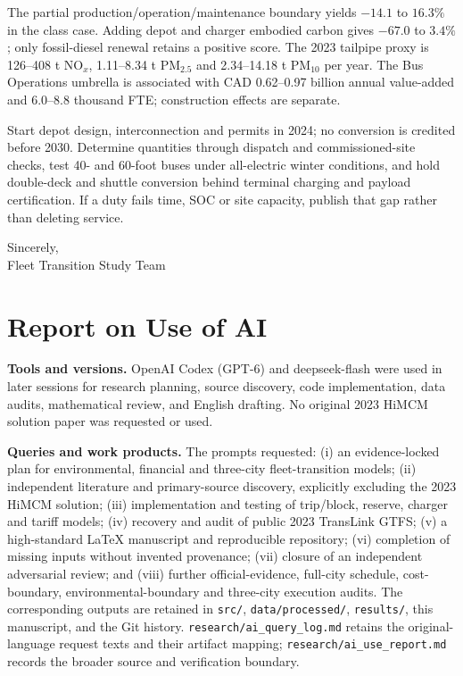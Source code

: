 \documentclass[12pt,letterpaper]{article}
\begin{document}
The partial production/operation/maintenance boundary yields $-14.1$ to $16.3\%$ in the class case. Adding depot and charger embodied carbon gives $-67.0$ to $3.4\%$; only fossil-diesel renewal retains a positive score. The 2023 tailpipe proxy is 126--408 t NO$_x$, 1.11--8.34 t PM$_{2.5}$ and 2.34--14.18 t PM$_{10}$ per year. The Bus Operations umbrella is associated with CAD 0.62--0.97 billion annual value-added and 6.0--8.8 thousand FTE; construction effects are separate.

Start depot design, interconnection and permits in 2024; no conversion is credited before 2030. Determine quantities through dispatch and commissioned-site checks, test 40- and 60-foot buses under all-electric winter conditions, and hold double-deck and shuttle conversion behind terminal charging and payload certification. If a duty fails time, SOC or site capacity, publish that gap rather than deleting service.

Sincerely,\\
Fleet Transition Study Team

\newpage
\section*{Report on Use of AI}
\textbf{Tools and versions.} OpenAI Codex (GPT-6) and deepseek-flash were used in later sessions for research planning, source discovery, code implementation, data audits, mathematical review, and English drafting. No original 2023 HiMCM solution paper was requested or used.\cite{aicodex}

\textbf{Queries and work products.} The prompts requested: (i) an evidence-locked plan for environmental, financial and three-city fleet-transition models; (ii) independent literature and primary-source discovery, explicitly excluding the 2023 HiMCM solution; (iii) implementation and testing of trip/block, reserve, charger and tariff models; (iv) recovery and audit of public 2023 TransLink GTFS; (v) a high-standard LaTeX manuscript and reproducible repository; (vi) completion of missing inputs without invented provenance; (vii) closure of an independent adversarial review; and (viii) further official-evidence, full-city schedule, cost-boundary, environmental-boundary and three-city execution audits. The corresponding outputs are retained in \texttt{src/}, \texttt{data/processed/}, \texttt{results/}, this manuscript, and the Git history. \nolinkurl{research/ai_query_log.md} retains the original-language request texts and their artifact mapping; \nolinkurl{research/ai_use_report.md} records the broader source and verification boundary.
\end{document}
